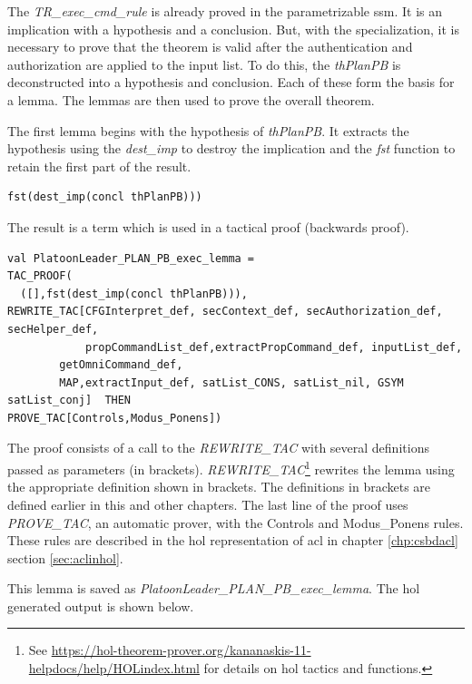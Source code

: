 \documentclass[../../main/main.tex]{subfiles}
\begin{document}
The \textit{TR_exec_cmd_rule} is already proved in the parametrizable ssm. It is an implication with a hypothesis and a conclusion.  But, with the specialization, it is necessary to prove that the theorem is valid after the authentication and authorization are applied to the input list. To do this, the \textit{thPlanPB} is deconstructed into a hypothesis and conclusion.  Each of these form the basis for a lemma.  The lemmas are then used to prove the overall theorem.

The first lemma begins with the hypothesis of \textit{thPlanPB}. It extracts the hypothesis using the \textit{dest_imp} to destroy the implication and the \textit{fst} function to retain the first part of the result.  

\begin{lstlisting}
fst(dest_imp(concl thPlanPB)))
\end{lstlisting}

The result is a  term which is used in a tactical proof (backwards proof).
\begin{lstlisting}
val PlatoonLeader_PLAN_PB_exec_lemma =
TAC_PROOF(
  ([],fst(dest_imp(concl thPlanPB))),
REWRITE_TAC[CFGInterpret_def, secContext_def, secAuthorization_def, secHelper_def,
            propCommandList_def,extractPropCommand_def, inputList_def,
	    getOmniCommand_def,
	    MAP,extractInput_def, satList_CONS, satList_nil, GSYM satList_conj]  THEN
PROVE_TAC[Controls,Modus_Ponens])
\end{lstlisting}

The proof consists of a call to the \textit{REWRITE_TAC} with several definitions passed as parameters (in brackets).  \textit{REWRITE_TAC}\footnote{See \url{https://hol-theorem-prover.org/kananaskis-11-helpdocs/help/HOLindex.html} for details on \gls{hol} tactics and functions.} rewrites the lemma using the appropriate definition shown in brackets.  The definitions in brackets are defined earlier in this and other chapters. The last line of the proof uses \textit{PROVE_TAC}, an automatic prover, with the Controls and Modus_Ponens rules.  These rules are described in the \gls{hol} representation of \gls{acl} in chapter \ref{chp:csbdacl} section \ref{sec:aclinhol}.

This lemma is saved as \textit{PlatoonLeader_PLAN_PB_exec_lemma}.  The \gls{hol} generated output is shown below.

\HOLssmPBIntegratedTheoremsPlatoonLeaderXXPLANXXPBXXexecXXlemma
\end{document}
